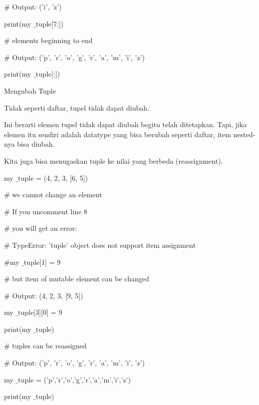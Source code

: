  $  \#  $ Output: ('i', 'z') \par
print(my $  \_  $tuple[7:]) \par
\vspace{12pt}
 $  \#  $ elements beginning to end \par
 $  \#  $ Output: ('p', 'r', 'o', 'g', 'r', 'a', 'm', 'i', 'z') \par
print(my $  \_  $tuple[:]) \par
\vspace{12pt}
Mengubah Tuple \par
\vspace{12pt}
Tidak seperti daftar, tupel tidak dapat diubah. \par
\vspace{12pt}
Ini berarti elemen tupel tidak dapat diubah begitu telah ditetapkan. Tapi, jika elemen itu sendiri adalah datatype yang bisa berubah seperti daftar, item nested-nya bisa diubah. \par
\vspace{12pt}
Kita juga bisa menugaskan tuple ke nilai yang berbeda (reassignment). \par
\vspace{12pt}
my $  \_  $tuple = (4, 2, 3, [6, 5]) \par
\vspace{12pt}
 $  \#  $ we cannot change an element \par
 $  \#  $ If you uncomment line 8 \par
 $  \#  $ you will get an error: \par
 $  \#  $ TypeError: 'tuple' object does not support item assignment \par
\vspace{12pt}
 $  \#  $my $  \_  $tuple[1] = 9 \par
\vspace{12pt}
 $  \#  $ but item of mutable element can be changed \par
 $  \#  $ Output: (4, 2, 3, [9, 5]) \par
my $  \_  $tuple[3][0] = 9 \par
print(my $  \_  $tuple) \par
\vspace{12pt}
 $  \#  $ tuples can be reassigned \par
 $  \#  $ Output: ('p', 'r', 'o', 'g', 'r', 'a', 'm', 'i', 'z') \par
my $  \_  $tuple = ('p','r','o','g','r','a','m','i','z') \par
print(my $  \_  $tuple) \par
